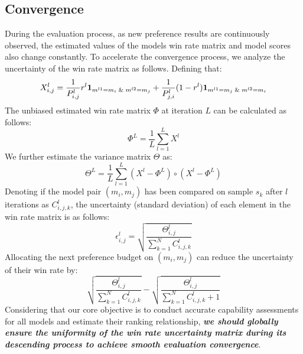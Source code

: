 % 
% 
\subsection{Convergence}
\label{sec:3.3}
During the evaluation process, as new preference results are continuously observed, the estimated values of the models win rate matrix and model scores also change constantly. 
To accelerate the convergence process, we analyze the uncertainty of the win rate matrix as follows.
Defining that:
\begin{equation}
    X^l_{i,j} = \frac{1}{P^l_{i,j}}r^l\1_{m^{l1}=m_i \And m^{l2}=m_j} + \frac{1}{P^l_{j,i}}(1-r^l)\1_{m^{l1}=m_j \And m^{l2}=m_i}
    \label{eq:6}
\end{equation}
The unbiased estimated win rate matrix $\Phi$ at iteration $L$ can be calculated as follows:
\begin{equation}
    \Phi^L = \frac{1}{L}\sum_{l=1}^L X^l
    \label{eq:7}
\end{equation}
We further estimate the variance matrix $\Theta$ as:
\begin{equation}
    \Theta^L = \frac{1}{L}\sum_{l=1}^L(X^l-\Phi^L)\circ (X^l-\Phi^L)
    \label{eq:8}
\end{equation}
Denoting if the model pair $(m_i,m_j)$ has been compared on sample $s_k$ after $l$ iterations as $C^l_{i,j,k}$, the uncertainty (standard deviation) of each element in the win rate matrix is as follows:
\begin{equation}
    \epsilon^l_{i,j} = \sqrt{\frac{\Theta^l_{i,j}}{\sum_{k=1}^{N} C^l_{i,j,k}}}
    \label{eq:9}
\end{equation}
Allocating the next preference budget on $(m_i,m_j)$ can reduce the uncertainty of their win rate by:
\begin{equation}
    \sqrt{\frac{\Theta^l_{i,j}}{\sum_{k=1}^{N} C^l_{i,j,k}}} - \sqrt{\frac{\Theta^l_{i,j}}{\sum_{k=1}^{N} C^l_{i,j,k}+1}}
    \label{eq:10}
\end{equation}
Considering that our core objective is to conduct accurate capability assessments for all models and estimate their ranking relationship, \textit{\textbf{we should globally ensure the uniformity of the win rate uncertainty matrix during its descending process to achieve smooth evaluation convergence}}.


